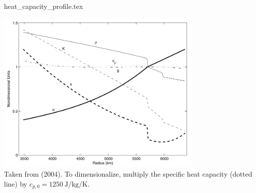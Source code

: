 \begin{flushright} {\tiny {\color{gray} heat\_capacity\_profile.tex}} \end{flushright}


\begin{center}
\includegraphics[width=10cm]{images/thermal_expansion/buja04}\\
{\captionfont 
Taken from \textcite{buja04} (2004).
To dimensionalize, multiply the specific heat capacity (dotted line) 
by $c_{p,0}=1250~\si{\joule\per\kg\per\kelvin}$.}
\end{center}
